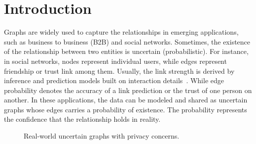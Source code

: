 \section{Introduction}

\label{sec:Intro}

Graphs are widely used to capture the relationships in emerging applications, such as business to business (B2B) and social networks. 
Sometimes, the existence of the relationship between two entities is uncertain (probabilistic). For instance, in social networks, nodes represent individual users, while edges represent friendship or trust link among them.  Usually, the link strength is derived by inference and prediction models built on interaction details~\cite{Adar_Managing_2007,Kempe_Maximizing_2003}. While edge probability denotes the accuracy of a link prediction or the trust of one person on another. 
In these applications, the data can be modeled and shared as uncertain graphs whose edges carries a probability of existence. The probability represents the confidence that the relationship holds in reality. 

\begin{figure}[!htb]
    \vspace{-6pt}
    \caption{Real-world uncertain graphs with privacy concerns.}
    \label{fig:motivation}
    \vspace{-10pt}
\end{figure} 

